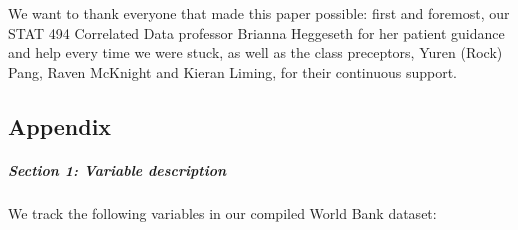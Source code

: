 \documentclass[
]{article}
\begin{document}
We want to thank everyone that made this paper possible: first and
foremost, our STAT 494 Correlated Data professor Brianna Heggeseth for
her patient guidance and help every time we were stuck, as well as the
class preceptors, Yuren (Rock) Pang, Raven McKnight and Kieran Liming,
for their continuous support.

\hypertarget{appendix}{%
\subsection{Appendix}\label{appendix}}

\hypertarget{section-1-variable-description}{%
\subparagraph{Section 1: Variable
description}\label{section-1-variable-description}}

We track the following variables in our compiled World Bank dataset:
\end{document}
